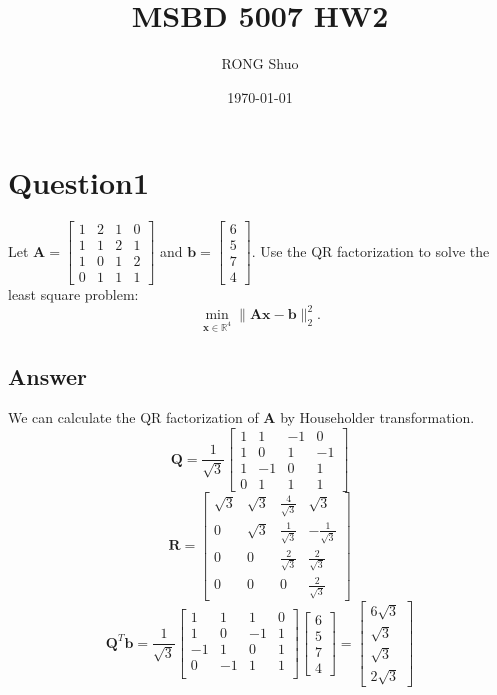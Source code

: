 \documentclass{article}
\title{MSBD 5007 HW2}
\author{RONG Shuo}
\date{\today}
\newcommand{\R}{\mathbb{R}}
\begin{document}
\maketitle

\section*{Question1}
Let \(\bm{A} = \begin{bmatrix}
    1 & 2 & 1 & 0 \\ 
    1 & 1 & 2 & 1 \\ 
    1 & 0 & 1 & 2 \\ 
    0 & 1 & 1 & 1  
\end{bmatrix}\) and \(\bm{b} = \begin{bmatrix}
    6 \\
    5 \\
    7 \\
    4 
\end{bmatrix}\). Use the QR factorization to solve the least square problem:
\[
    \min_{\bm{x} \in \R^4} \|\bm{Ax} - \bm{b}\|_2^2.
\]

\subsection*{Answer}
We can calculate the QR factorization of \(\bm{A}\) by Householder transformation. 
\[
    \bm{Q} = \frac{1}{\sqrt{3}}\begin{bmatrix}
       1 & 1 & -1 & 0  \\
       1 & 0 & 1 & -1  \\
       1 & -1 & 0 & 1  \\
       0 & 1 & 1 & 1  
    \end{bmatrix}
\]
\[
    \bm{R} = \begin{bmatrix}
       \sqrt{3} & \sqrt{3} & \frac{4}{\sqrt{3}} & \sqrt{3}  \\
       0 & \sqrt{3} & \frac{1}{\sqrt{3}} & -\frac{1}{\sqrt{3}}  \\
       0 & 0 & \frac{2}{\sqrt{3}} & \frac{2}{\sqrt{3}}  \\
       0 & 0 & 0 & \frac{2}{\sqrt{3}}  
    \end{bmatrix}
\]
\[
    \bm{Q}^T\bm{b}= \frac{1}{\sqrt{3}}\begin{bmatrix}
        1 &1 &1 &0\\
        1 &0 &-1 &1 \\
        -1 &1 &0 &1 \\
        0 &-1 &1 &1 \\
    \end{bmatrix}\begin{bmatrix}
        6 \\
        5 \\
        7 \\
        4
    \end{bmatrix} = \begin{bmatrix}
        6\sqrt{3} \\
        \sqrt{3} \\
        \sqrt{3} \\
        2\sqrt{3}
    \end{bmatrix}
\]
\end{document}

